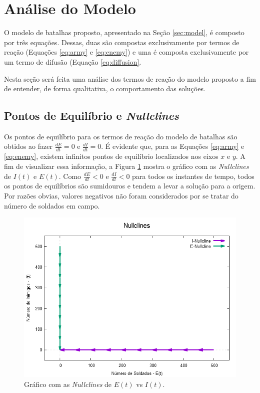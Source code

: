 \documentclass{article}
\begin{document}
\section{Análise do Modelo}

O modelo de batalhas proposto, apresentado na Seção \ref{sec:model}, é composto por três equações. Dessas, duas são compostas exclusivamente por termos de reação (Equações \ref{eq:army} e \ref{eq:enemy}) e uma é composta exclusivamente por um termo de difusão (Equação \ref{eq:diffusion}.

Nesta seção será feita uma análise dos termos de reação do modelo proposto a fim de entender, de forma qualitativa, o comportamento das soluções.

\subsection{Pontos de Equilíbrio e \textit{Nullclines}}

Os pontos de equilíbrio para os termos de reação do modelo de batalhas são obtidos ao fazer $\frac{dE}{dt} = 0$ e $\frac{dI}{dt} = 0$. É evidente que, para as Equações \ref{eq:army} e \ref{eq:enemy}, existem infinitos pontos de equilíbrio localizados nos eixos $x$ e $y$. A fim de visualizar essa informação, a Figura \ref{fig:nullclines} mostra o gráfico com as \textit{Nullclines} de $I(t)$ e $E(t)$. Como $\frac{dE}{dt} < 0$ e $\frac{dI}{dt} < 0$ para todos os instantes de tempo, todos os pontos de equilíbrios são sumidouros e tendem a levar a solução para a origem. Por razões obvias, valores negativos não foram considerados por se tratar do número de soldados em campo.

\begin{figure}[ht]
	\centering
	\includegraphics[scale=0.35]{figs/nullclines.png}
	\caption{Gráfico com as \textit{Nullclines} de $E(t)$ vs $I(t)$.}
	\label{fig:nullclines}
\end{figure}
\end{document}
